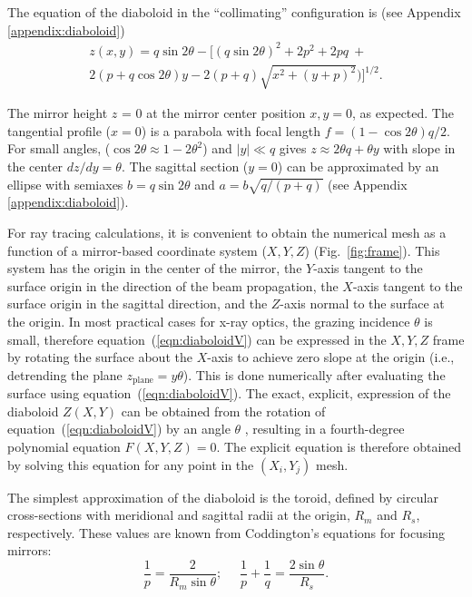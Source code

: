 \documentclass[preprint]{iucr}       %
\begin{document}
The equation of the diaboloid in the ``collimating'' configuration is (see Appendix \ref{appendix:diaboloid})
\begin{multline}
\label{eqn:diaboloidV}
z(x,y) = q \sin2\theta - 
[ (q \sin{2\theta})^2 + 2p^2 + 2 p q~+\\
2 (p + q \cos{2\theta}) y - 2 (p+q) \sqrt{x^2 + (y + p)^2}) ]^{1/2}.
\end{multline}

The mirror height $z$ = 0 at the mirror center position $x, y = 0$, as expected. The tangential profile ($x=0$) is a parabola with focal length $ f = (1-\cos2\theta) q/2$. For small angles, ($\cos2\theta\approx 1 - 2\theta^2$) and $|y|\ll q$ gives $z\approx 2 \theta q + \theta y$ with slope in the center $dz/dy=\theta$. The sagittal section ($y=0$) can be approximated by an ellipse with semiaxes $b=q \sin2\theta$ and $a=b \sqrt{q /(p+q)}$ (see Appendix \ref{appendix:diaboloid}). 

For ray tracing calculations, it is convenient to obtain the numerical mesh as a function of a mirror-based coordinate system ($X,Y,Z$) (Fig.~\ref{fig:frame}). This system has the origin in the center of the mirror, the $Y$-axis tangent to the surface origin in the direction of the beam propagation, the $X$-axis tangent to the surface origin in the sagittal direction, and the $Z$-axis normal to the surface at the origin. In most practical cases for x-ray optics, the grazing incidence $\theta$ is small, therefore equation~(\ref{eqn:diaboloidV}) can be expressed in the $X,Y,Z$ frame by rotating the surface about the $X$-axis to achieve zero slope at the origin (i.e., detrending the plane $z_{\mathrm{plane}}=y \theta$). This is done numerically after evaluating the surface using equation~(\ref{eqn:diaboloidV}). The exact, explicit, expression of the diaboloid $Z(X,Y)$ can be obtained from the rotation of equation~(\ref{eqn:diaboloidV}) by an angle $\theta$ \cite{val2021}, resulting in a fourth-degree polynomial equation $F(X,Y,Z)=0$. The explicit equation is therefore obtained by solving this equation for any point in the $(X_i,Y_j)$ mesh.


The simplest approximation of the diaboloid is the toroid, defined by circular cross-sections with meridional and sagittal radii at the origin, $R_m$ and $R_s$, respectively. These values are known from Coddington's equations for focusing mirrors:
\begin{equation}
\label{eqn:radii}
\frac{1}{p} = \frac{2 }{R_m \sin\theta };~~~~~~
\frac{1}{p} + \frac{1}{q} = \frac{2\sin\theta}{ R_s}.
\end{equation}
\end{document}
